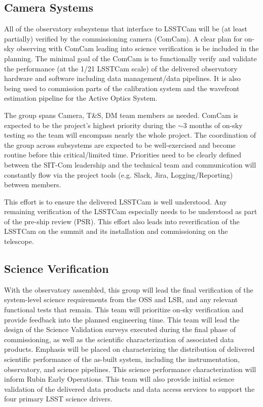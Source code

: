 \documentclass[SE,lsstdraft,authoryear,toc]{lsstdoc, lsstdraft}
\begin{document}
\subsection{Camera Systems}
All of the observatory subsystems that interface to LSSTCam will be (at least partially) verified by the commissioning camera (ComCam).
A clear plan for on-sky observing with ComCam leading into science verification is be included in the planning.
The minimal goal of the ComCam is to functionally verify and validate the performance (at the 1/21 LSSTCam scale) of the delivered observatory hardware and software including data management/data pipelines.
It is also being used to commission parts of the calibration system and the wavefront estimation pipeline for the Active Optics System.

The group spans Camera, T\&S, DM team members as needed.
ComCam is expected to be the project's highest priority during the $\sim$3 months of on-sky testing so the team will encompass nearly the whole project.
The coordination of the group across subsystems are expected to be well-exercised and become routine before this critical/limited time.
Priorities need to be clearly defined between the SIT-Com leadership and the technical team and communication will constantly flow via the project tools (e.g. Slack, Jira, Logging/Reporting) between members.

This effort is to ensure the delivered LSSTCam is well understood.
Any remaining verification of the LSSTCam especially needs to be understood as part of the pre-ship review (PSR).
This effort also leads into reverification of the LSSTCam on the summit and its installation and commissioning on the telescope.


\subsection{Science Verification}
With the observatory assembled, this group will lead the final verification of the system-level science requirements from the OSS and LSR, and any relevant functional tests that remain.
This team will prioritize on-sky verification and provide feedback into the planned engineering time.
This team will lead the design of the Science Validation surveys executed during the final phase of commissioning, as well as the scientific characterization of associated data products.
Emphasis will be placed on characterizing the distribution of delivered scientific performance of the as-built system, including the instrumentation, observatory, and science pipelines.
This science performance characterization will inform Rubin Early Operations.
This team will also provide initial science validation of the delivered data products and data access services to support the four primary LSST science drivers.
\end{document}
